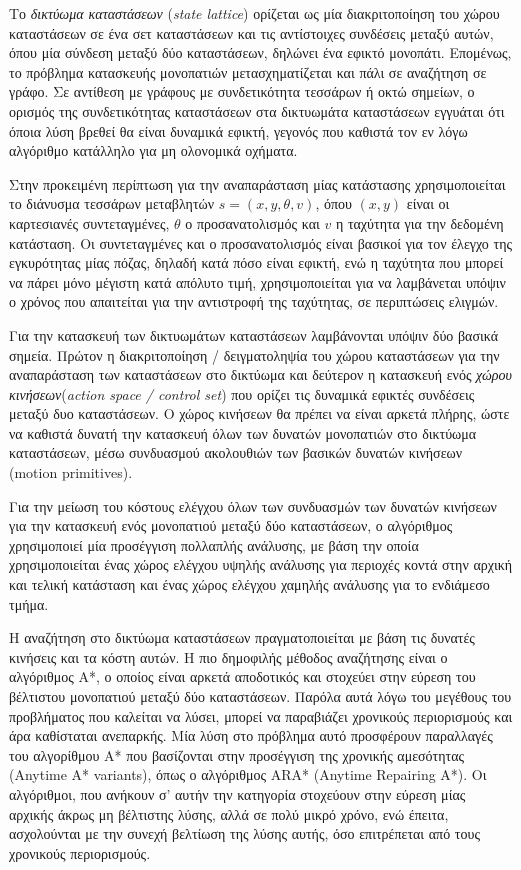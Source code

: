 \bigskip
Το \textit{δικτύωμα καταστάσεων} (\textit{state lattice}) ορίζεται ως μία διακριτοποίηση του χώρου καταστάσεων σε ένα σετ καταστάσεων και τις αντίστοιχες συνδέσεις μεταξύ αυτών, όπου μία σύνδεση μεταξύ δύο καταστάσεων, δηλώνει ένα εφικτό μονοπάτι. Επομένως, το πρόβλημα κατασκευής μονοπατιών μετασχηματίζεται και πάλι σε αναζήτηση σε γράφο. Σε αντίθεση με γράφους με συνδετικότητα τεσσάρων ή οκτώ σημείων, ο ορισμός της συνδετικότητας καταστάσεων στα δικτυωμάτα καταστάσεων εγγυάται ότι όποια λύση βρεθεί θα είναι δυναμικά εφικτή, γεγονός που καθιστά τον εν λόγω αλγόριθμο κατάλληλο για μη ολονομικά οχήματα.

\bigskip
Στην προκειμένη περίπτωση για την αναπαράσταση μίας κατάστασης χρησιμοποιείται το διάνυσμα τεσσάρων μεταβλητών $s=(x, y, \theta, v)$, όπου $(x, y)$ είναι οι καρτεσιανές συντεταγμένες, $\theta$ ο προσανατολισμός και $v$ η ταχύτητα για την δεδομένη κατάσταση. Οι συντεταγμένες και ο προσανατολισμός είναι βασικοί για τον έλεγχο της εγκυρότητας μίας πόζας, δηλαδή κατά πόσο είναι εφικτή, ενώ η ταχύτητα που μπορεί να πάρει μόνο μέγιστη κατά απόλυτο τιμή, χρησιμοποιείται για να λαμβάνεται υπόψιν ο χρόνος που απαιτείται για την αντιστροφή της ταχύτητας, σε περιπτώσεις ελιγμών.

\bigskip
Για την κατασκευή των δικτυωμάτων καταστάσεων λαμβάνονται υπόψιν δύο βασικά σημεία. Πρώτον η  διακριτοποίηση / δειγματοληψία του χώρου καταστάσεων για την αναπαράσταση των καταστάσεων στο δικτύωμα και δεύτερον η κατασκευή ενός \textit{χώρου κινήσεων}(\textit{action space / control set}) που ορίζει τις δυναμικά εφικτές συνδέσεις μεταξύ δυο καταστάσεων. Ο χώρος κινήσεων θα πρέπει να είναι αρκετά πλήρης, ώστε να καθιστά δυνατή την κατασκευή όλων των δυνατών μονοπατιών στο δικτύωμα καταστάσεων, μέσω συνδυασμού ακολουθιών των βασικών δυνατών κινήσεων (motion primitives).

\bigskip
Για την μείωση του κόστους ελέγχου όλων των συνδυασμών των δυνατών κινήσεων για την κατασκευή ενός μονοπατιού μεταξύ δύο καταστάσεων, ο αλγόριθμος χρησιμοποιεί μία προσέγγιση πολλαπλής ανάλυσης, με βάση την οποία χρησιμοποιείται ένας χώρος ελέγχου υψηλής ανάλυσης για περιοχές κοντά στην αρχική και τελική κατάσταση και ένας χώρος ελέγχου χαμηλής ανάλυσης για το ενδιάμεσο τμήμα.

\bigskip
Η αναζήτηση στο δικτύωμα καταστάσεων πραγματοποιείται με βάση τις δυνατές κινήσεις και τα κόστη αυτών. Η πιο δημοφιλής μέθοδος αναζήτησης είναι ο αλγόριθμος A*, ο οποίος είναι αρκετά αποδοτικός και στοχεύει στην εύρεση του βέλτιστου μονοπατιού μεταξύ δύο καταστάσεων. Παρόλα αυτά λόγω του μεγέθους του προβλήματος που καλείται να λύσει, μπορεί να παραβιάζει χρονικούς περιορισμούς και άρα καθίσταται ανεπαρκής. Μία λύση στο πρόβλημα αυτό προσφέρουν παραλλαγές του αλγορίθμου A* που βασίζονται στην προσέγγιση της χρονικής αμεσότητας (Anytime A* variants), όπως ο αλγόριθμος ARA* (Anytime Repairing A*). Οι αλγόριθμοι, που ανήκουν σ' αυτήν την κατηγορία στοχεύουν στην εύρεση μίας αρχικής άκρως μη βέλτιστης λύσης, αλλά σε πολύ μικρό χρόνο, ενώ έπειτα, ασχολούνται με την συνεχή βελτίωση της λύσης αυτής, όσο επιτρέπεται από τους χρονικούς περιορισμούς.

